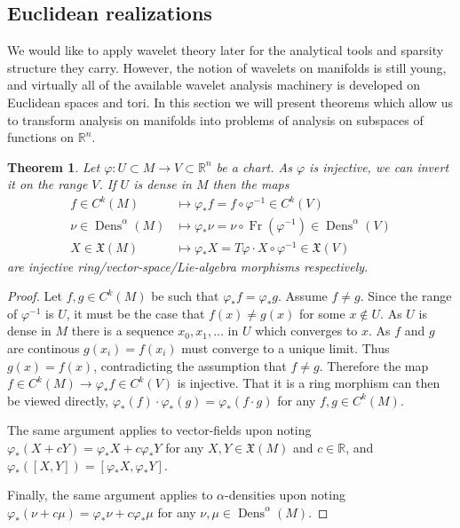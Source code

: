 \documentclass[letterpaper, 12 pt]{amsart}
\newcommand{\R}{\mathbb{R}}
\newtheorem{thm}{Theorem}[section]
\DeclareMathOperator{\Fr}{Fr}
\DeclareMathOperator{\Dens}{Dens}
\begin{document}
\subsection{Euclidean realizations}
\label{sec:euclidean}
  We would like to apply wavelet theory later for the
  analytical tools and sparsity structure they carry.
  However, the notion of wavelets on manifolds is still young,
  and virtually all of the available wavelet analysis machinery
  is developed on Euclidean spaces and tori.
  In this section we will present theorems which allow
  us to transform analysis on manifolds into problems
  of analysis on subspaces of functions on $\R^n$.

\begin{thm}
  \label{thm:Euclidean}
  Let $\varphi:U \subset M \to V \subset \R^n$ be a chart.
  As $\varphi$ is injective, we can invert it on the range $V$.
  If $U$ is dense in $M$ then the maps
  \begin{align*}
    f \in C^k(M) &\mapsto \varphi_*f = f \circ \varphi^{-1} \in C^k(V) \\
    \nu \in \Dens^\alpha(M) &\mapsto \varphi_* \nu = \nu \circ \Fr(\varphi^{-1}) \in \Dens^\alpha(V) \\
    X \in \mathfrak{X}(M) &\mapsto \varphi_* X = T\varphi \cdot X \circ \varphi^{-1} \in \mathfrak{X}(V)
  \end{align*}
  are injective ring/vector-space/Lie-algebra morphisms respectively.
  \end{thm}
  \begin{proof}
    Let $f,g \in C^k(M)$ be such that $\varphi_* f = \varphi_*g$.
    Assume $f \neq g$.
    Since the range of $\varphi^{-1}$ is $U$, it must be the case that
    $f(x) \neq g(x)$ for some $x \notin U$.
    As $U$ is dense in $M$ there is a sequence $x_0,x_1,\dots$ in $U$
    which converges to $x$.
    As $f$ and $g$ are continous $g(x_i) = f(x_i)$ must converge to a
    unique limit.  Thus $g(x) = f(x)$, contradicting the assumption
    that $f \neq g$.
    Therefore the map $f \in C^k(M) \to \varphi_* f \in C^k(V)$
    is injective.
    That it is a ring morphism can then be viewed directly, $\varphi_*(f) \cdot \varphi_*(g) = \varphi_*(f \cdot g)$ for any $f,g \in C^k(M)$.
    
    The same argument applies to vector-fields
    upon noting $\varphi_*(X+cY) = \varphi_*X + c \varphi_*Y$ for any $X,Y \in \mathfrak{X}(M)$ and $c \in \R$, and $\varphi_*([X,Y]) = [\varphi_*X, \varphi_*Y]$.

    Finally, the same argument applies to $\alpha$-densities
    upon noting $\varphi_*( \nu + c \mu) = \varphi_*\nu + c \varphi_* \mu$ for any $\nu,\mu \in \Dens^\alpha(M)$.
  \end{proof}
  
\end{document}
